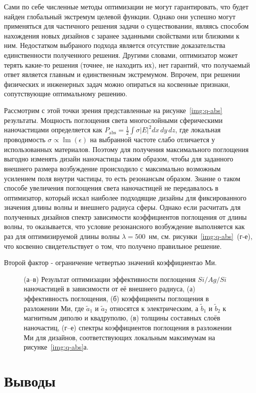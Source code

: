 Сами по себе численные методы оптимизации не могут гарантировать, что
будет найден глобальный экстремум целевой функции. Однако они успешно
могут применяться для частичного решения задачи о существовании,
являясь способом нахождения новых дизайнов с заранее заданными
свойствами или близкими к ним.  Недостатком выбраного подхода является
отсутствие доказательства единственности полученного решения.  Другими
словами, оптимизатор может терять какие-то решения (точнее, не
находить их), нет гарантий, что получаемый ответ является главным и
единственным экстремумом.  Впрочем, при решении физических и
инженерных задач можно опираться на косвенные признаки, сопутствующие
оптимальному решению.

Рассмотрим с этой точки зрения представленные на
рисунке~\ref{img:q-abs} результаты.  Мощность поглощения света
многослойными сферическими наночастицами определяется как
$P_{\mathrm {abs}}=\frac{1}{2}\int\sigma \left|E\right|^2dx\,dy\,dz$,
где локальная проводимость
$\sigma\propto \operatorname{\mathbb{I}m} (\epsilon)$ на выбранной
частоте слабо отличается у использованных материалов. Поэтому для
получения максимального поглощения выгодно изменять дизайн наночастицы
таким образом, чтобы для заданного внешнего размера возбуждение
происходило с максимально возможным усилением поля внутри частицы, то
есть резонансым образом. Знание о таком способе увеличения поглощения
света наночастицей не передавалось в оптимизатор, который искал
наиболее подходящие дизайны для фиксированного значения длины волны и
внешнего радиуса сферы. Однако если расчитать для полученных дизайнов
спектр зависимости коэффициентов поглощения от длины волны, то
оказывается, что условие резонансного возбуждение выполняется как раз
для оптимизируемой длины волны $\lambda=500$~нм,
см. рисунки~\ref{img:q-abs}~(г-е), что косвенно свидетельствует о том,
что получено правильное решение.

Второй фактор - ограничение четвертью значений коэффициентао Ми.


 

\begin{figure}[t]
  \caption{ (а--в) Результат оптимизации эффективности поглощения
    $Si/Ag/Si$ наночастицей в зависимости от её внешнего радиуса, (а)
    эффективность поглощения, (б) коэффициенты поглощения в разложении
    Ми, где $\tilde{a}_1$ и $\tilde{a}_2$ относятся к электрическим, а
    $\tilde{b}_1$ и $\tilde{b}_2$ к магнитным диполю и квадруполю, (в)
    толщины составных слоёв наночастиц, (г--е) спектры коэффициентов
    поглощения в разложении Ми для дизайнов, соответствующих локальным
    максимумам на рисунке~\ref{img:q-abs}а.}
  \label{img:absorb-field}  
\end{figure}


\section{Выводы}



\clearpage